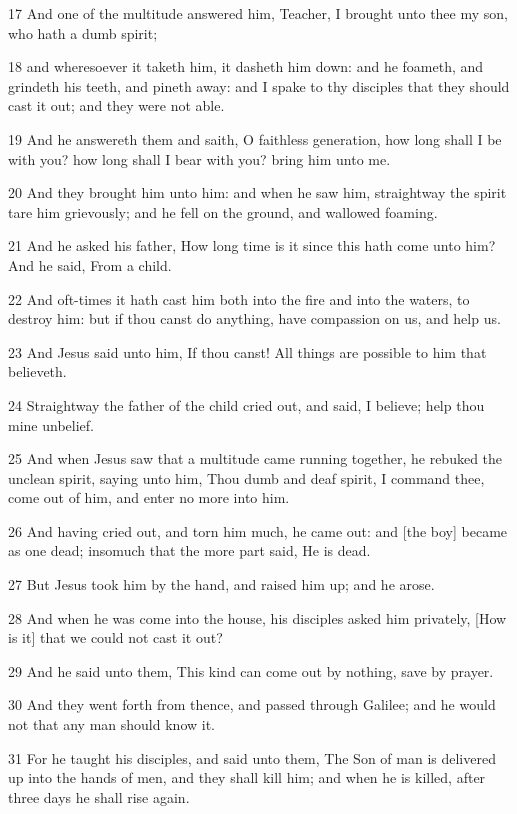 \par 17 And one of the multitude answered him, Teacher, I brought unto thee my son, who hath a dumb spirit;
\par 18 and wheresoever it taketh him, it dasheth him down: and he foameth, and grindeth his teeth, and pineth away: and I spake to thy disciples that they should cast it out; and they were not able.
\par 19 And he answereth them and saith, O faithless generation, how long shall I be with you? how long shall I bear with you? bring him unto me.
\par 20 And they brought him unto him: and when he saw him, straightway the spirit tare him grievously; and he fell on the ground, and wallowed foaming.
\par 21 And he asked his father, How long time is it since this hath come unto him? And he said, From a child.
\par 22 And oft-times it hath cast him both into the fire and into the waters, to destroy him: but if thou canst do anything, have compassion on us, and help us.
\par 23 And Jesus said unto him, If thou canst! All things are possible to him that believeth.
\par 24 Straightway the father of the child cried out, and said, I believe; help thou mine unbelief.
\par 25 And when Jesus saw that a multitude came running together, he rebuked the unclean spirit, saying unto him, Thou dumb and deaf spirit, I command thee, come out of him, and enter no more into him.
\par 26 And having cried out, and torn him much, he came out: and [the boy] became as one dead; insomuch that the more part said, He is dead.
\par 27 But Jesus took him by the hand, and raised him up; and he arose.
\par 28 And when he was come into the house, his disciples asked him privately, [How is it] that we could not cast it out?
\par 29 And he said unto them, This kind can come out by nothing, save by prayer.
\par 30 And they went forth from thence, and passed through Galilee; and he would not that any man should know it.
\par 31 For he taught his disciples, and said unto them, The Son of man is delivered up into the hands of men, and they shall kill him; and when he is killed, after three days he shall rise again.
